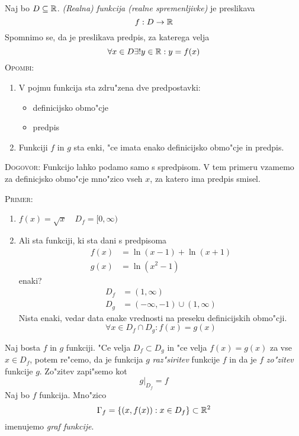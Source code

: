 Naj bo $D \subseteq \mathbb{R}$. \emph{(Realna) funkcija (realne spremenljivke)} je preslikava
\begin{equation*}
f: D \to \mathbb{R}
\end{equation*}
Spomnimo se, da je preslikava predpis, za katerega velja
\begin{equation*}
\forall x \in D \exists! y \in \mathbb{R}: y = f(x)
\end{equation*}
\textsc{Opombi:}
\begin{enumerate}
	\item V pojmu funkcija sta zdru"zena dve predpostavki:
	\begin{itemize}
		\item definicijsko obmo"cje
		\item predpis
	\end{itemize}

	\item Funkciji $f$ in $g$ sta enki, "ce imata enako definicijsko obmo"cje in predpis.
\end{enumerate}
\textsc{Dogovor:} Funkcijo lahko podamo samo s spredpisom. V tem primeru vzamemo za definicjsko obmo"cje mno"zico vseh $x$, za katero ima predpis smisel.

\textsc{Primer:}
\begin{enumerate}[1)]
	\item $f(x) = \sqrt{x} \quad D_f = [0, \infty)$
	\item Ali sta funkciji, ki sta dani s predpisoma
	\begin{align*}
	f(x) &= \ln (x-1) + \ln (x+1) \\
	g(x) &= \ln (x^2 - 1)
	\end{align*}
	enaki?
	\begin{align*}
	D_f &= (1, \infty) \\
	D_g &= (-\infty, -1) \cup (1, \infty)
	\end{align*}
	Nista enaki, vedar data enake vrednosti na preseku definicijskih obmo"cji.
	\begin{equation*}
	\forall x \in D_f \cap D_g: f(x) = g(x)
	\end{equation*}
\end{enumerate}
 Naj bosta $f$ in $g$ funkciji. "Ce velja $D_f \subset D_g$ in "ce velja $f(x) = g(x)$ za vse $x \in D_f$, potem re"cemo, da je funkcija $g$ \emph{raz"siritev} funkcije $f$ in da je $f$ \emph{zo"zitev} funkcije $g$. Zo"zitev zapi"semo kot
\begin{equation*}
g|_{D_f} = f
\end{equation*}
 Naj bo $f$ funkcija. Mno"zico
\begin{equation*}
\Gamma_f = \{(x, f(x)): x \in D_f\} \subset \mathbb{R}^2
\end{equation*}
imenujemo \emph{graf funkcije}.

